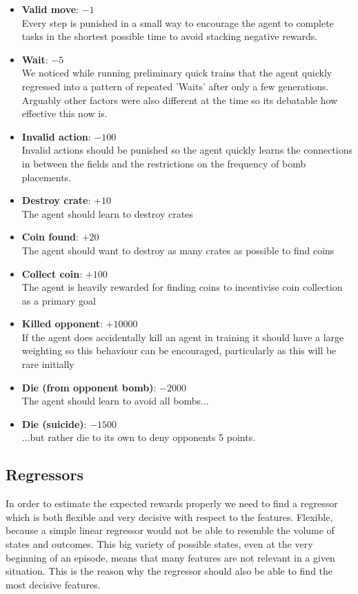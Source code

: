 \begin{itemize}
	\item \textbf{Valid move}: $-1$ \\Every step is punished in a small way to encourage the agent to complete tasks in the shortest possible time to avoid stacking negative rewards.
	\item \textbf{Wait}: $-5$\\We noticed while running preliminary quick trains that the agent quickly regressed into a pattern of repeated 'Waits' after only a few generations. Arguably other factors were also different at the time so its debatable how effective this now is.
	\item \textbf{Invalid action}: $-100$\\Invalid actions should be punished so the agent quickly learns the connections in between the fields and the restrictions on the frequency of bomb placements.
	\item \textbf{Destroy crate}: $+10$\\The agent should learn to destroy crates
	\item \textbf{Coin found}: $+20$\\The agent should want to destroy as many crates as possible to find coins
	\item \textbf{Collect coin}: $+100$\\The agent is heavily rewarded for finding coins to incentivise coin collection as a primary goal 
	\item \textbf{Killed opponent}: $+10000$\\If the agent does accidentally kill an agent in training it should have a large weighting so this behaviour can be encouraged, particularly as this will be rare initially
	\item \textbf{Die (from opponent bomb)}: $-2000$\\The agent should learn to avoid all bombs...
	\item \textbf{Die (suicide)}: $-1500$\\...but rather die to its own to deny opponents 5 points.
\end{itemize}	
	
	\subsection{Regressors}
	In order to estimate the expected rewards properly we need to find a regressor which is both flexible and very decisive with respect to the features. Flexible, because a simple linear regressor would not be able to resemble the volume of states and outcomes. This big variety of possible states, even at the very beginning of an episode, means that many features are not relevant in a given situation. This is the reason why the regressor should also be able to find the most decisive features.\par
	
